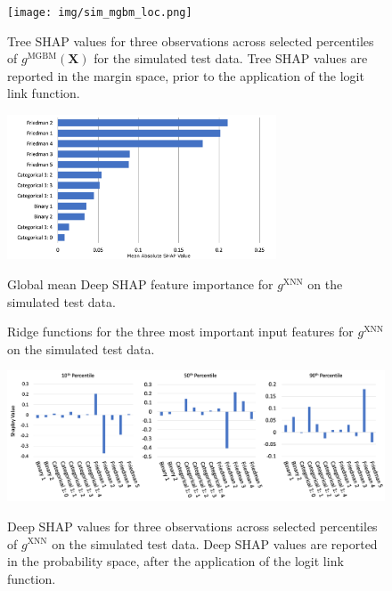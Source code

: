 \documentclass[information,article,submit,moreauthors,pdftex]{definitions/mdpi}
\begin{document}

\begin{figure}[H]
\centering
\texttt{[image: img/sim\_mgbm\_loc.png]}
\label{fig:sim_mgbm_loc}
\caption{Tree SHAP values for three observations across selected percentiles of $g^\text{MGBM}(\mathbf{X})$ for the simulated test data. Tree SHAP values are reported in the margin space, prior to the application of the logit link function.}
\end{figure}   

\begin{figure}[H]
\centering
\includegraphics[width=8cm]{img/sim_xnn_glob.png}
\label{fig:sim_xnn_glob}
\caption{Global mean Deep SHAP feature importance for $g^\text{XNN}$ on the simulated test data.}
\end{figure} 

\begin{figure}[H]
\centering
\label{fig:sim_xnn_glob_pdp_ice}
\caption{Ridge functions for the three most important input features for $g^\text{XNN}$ on the simulated test data.}
\end{figure}   

\begin{figure}[H]
\centering
\includegraphics[width=15cm]{img/sim_xnn_loc.png}
\label{fig:sim_xnn_loc}
\caption{Deep SHAP values for three observations across selected percentiles of  $g^\text{XNN}$ on the simulated test data. Deep SHAP values are reported in the probability space, after the application of the logit link function.}
\end{figure}  
\end{document}

